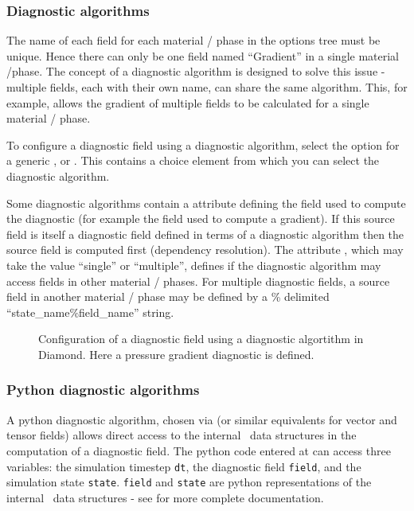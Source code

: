 \subsubsection{Diagnostic algorithms}

The name of each field for each material / phase  in the options tree must be
unique. Hence there can only be one field named ``Gradient'' in a single
material /phase. The concept of a diagnostic algorithm is designed to solve this
issue - multiple fields, each with their own name, can share the same algorithm.
This, for example, allows the gradient of multiple fields to be calculated for a
single material / phase.

To configure a diagnostic field using a diagnostic algorithm, select the
 option for a generic , 
or . This contains a 
choice element from which you can select the diagnostic algorithm.

Some diagnostic algorithms contain a 
attribute defining the field used to compute the diagnostic (for example the
field used to compute a gradient). If this source field is itself a diagnostic
field defined in terms of a diagnostic algorithm then the source field is
computed first (dependency resolution). The attribute
, which may take the
value ``single'' or ``multiple'', defines if the diagnostic algorithm may
access fields in other material / phases. For multiple 
diagnostic fields, a source field in another material / phase
may be defined by a \% delimited ``state\_name\%field\_name'' string.

\begin{figure}[ht]
  \centering
  \caption{Configuration of a diagnostic field using a diagnostic algortithm in
           Diamond. Here a pressure gradient diagnostic is defined.}
  \label{fig:diagnostic_algorithm}
\end{figure}

\subsubsection{Python diagnostic algorithms}

A python diagnostic algorithm, chosen via 
(or similar equivalents for vector and tensor fields) allows direct access to the
internal \fluidity\ data structures in the computation of a diagnostic field. The
python code entered at 
can access three variables: the simulation timestep \lstinline[language = Python]*dt*,
the diagnostic field \lstinline[language = Python]*field*, and the simulation state
\lstinline[language = Python]*state*. \lstinline[language = Python]*field* and
\lstinline[language = Python]*state* are python representations of the internal
\fluidity\ data structures - see \citet{femtools} for more complete documentation.

